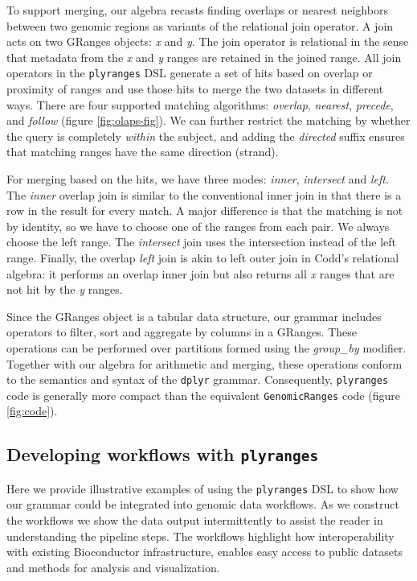 \documentclass[]{article}
\begin{document}
To support merging, our algebra recasts finding overlaps or nearest
neighbors between two genomic regions as variants of the relational join
operator. A join acts on two GRanges objects: \emph{x} and \emph{y}. The
join operator is relational in the sense that metadata from the \emph{x}
and \emph{y} ranges are retained in the joined range. All join operators
in the \texttt{plyranges} DSL generate a set of hits based on overlap or
proximity of ranges and use those hits to merge the two datasets in
different ways. There are four supported matching algorithms:
\emph{overlap}, \emph{nearest}, \emph{precede}, and \emph{follow}
(figure \ref{fig:olaps-fig}). We can further restrict the matching by
whether the query is completely \emph{within} the subject, and adding
the \emph{directed} suffix ensures that matching ranges have the same
direction (strand).

For merging based on the hits, we have three modes: \emph{inner},
\emph{intersect} and \emph{left}. The \emph{inner} overlap join is
similar to the conventional inner join in that there is a row in the
result for every match. A major difference is that the matching is not
by identity, so we have to choose one of the ranges from each pair. We
always choose the left range. The \emph{intersect} join uses the
intersection instead of the left range. Finally, the overlap \emph{left}
join is akin to left outer join in Codd's relational algebra: it
performs an overlap inner join but also returns all \emph{x} ranges that
are not hit by the \emph{y} ranges.

Since the GRanges object is a tabular data structure, our grammar
includes operators to filter, sort and aggregate by columns in a
GRanges. These operations can be performed over partitions formed using
the \emph{group\_by} modifier. Together with our algebra for arithmetic
and merging, these operations conform to the semantics and syntax of the
\texttt{dplyr} grammar. Consequently, \texttt{plyranges} code is
generally more compact than the equivalent \texttt{GenomicRanges} code
(figure \ref{fig:code}).

\hypertarget{developing-workflows-with-plyranges}{%
\subsection{\texorpdfstring{Developing workflows with
\texttt{plyranges}}{Developing workflows with plyranges}}\label{developing-workflows-with-plyranges}}

Here we provide illustrative examples of using the \texttt{plyranges}
DSL to show how our grammar could be integrated into genomic data
workflows. As we construct the workflows we show the data output
intermittently to assist the reader in understanding the pipeline steps.
The workflows highlight how interoperability with existing Bioconductor
infrastructure, enables easy access to public datasets and methods for
analysis and visualization.
\end{document}
